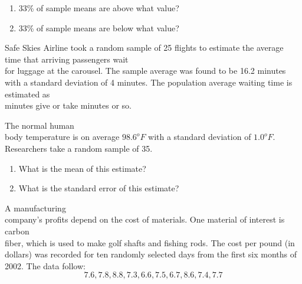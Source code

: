 \documentclass[11pt]{book}\usepackage[]{graphicx}\usepackage[]{color}
\begin{document}
\begin{exercises}
\begin{solution}
\begin{enumerate}
  

  \item 33\% of sample means are above what value? 
  \item 33\% of sample means are below what value?
\end{enumerate}
\end{solution}

\begin{exercise}  %

Safe Skies Airline took a random sample of 25 flights to estimate the average time that arriving passengers wait \\ for luggage at the carousel.  The sample average was found to be 16.2 minutes with a standard deviation of 4 minutes.  The population  average waiting time is estimated as \\ \underline{\phantom{xxxxxxxx}} minutes give or take  \underline{\phantom{xxxxxxxx}} minutes or  so.

\end{exercise}
\begin{solution}  %

\end{solution}

\begin{exercise}  %

The normal human \\ body temperature is on average $98.6^o F$ with a standard deviation of $1.0^o F$. Researchers take a random sample of 35. 

\begin{enumerate}
\item What is the mean of this estimate? 
\item What is the standard error of this estimate?
\end{enumerate}

\end{exercise}
\begin{solution}  %

\end{solution}

\begin{exercise}  %

A manufacturing \\ company's profits depend on the cost of materials.  One material of interest is carbon \\ fiber, which is used to make golf shafts and fishing rods.  The cost per pound (in dollars) was recorded for ten randomly selected days from the first six months of 2002. The data follow:
            $$7.6, 7.8, 8.8, 7.3, 6.6, 7.5, 6.7, 8.6, 7.4, 7.7$$
            

\end{exercise}
\end{exercises}
\end{document}
